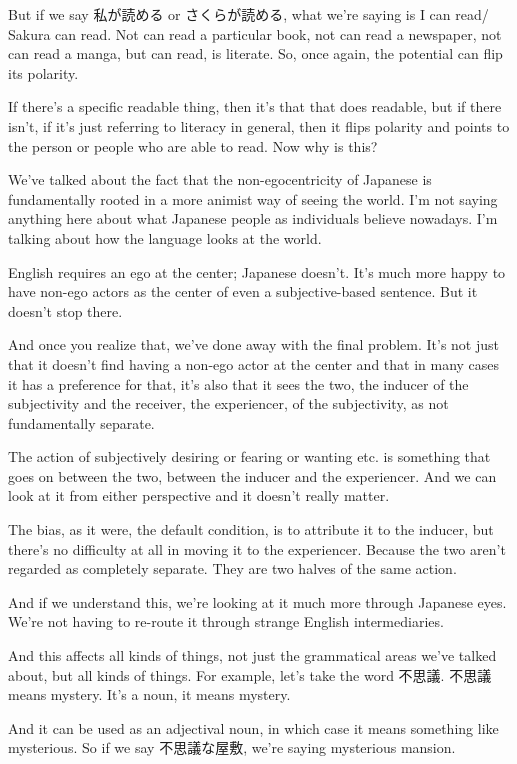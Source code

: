 But if we say 私が読める or さくらが読める, what we're saying is I can read/ Sakura can read. Not can read a particular book, not can read a newspaper, not can read a manga, but can read, is literate. So, once again, the potential can flip its polarity.

If there's a specific readable thing, then it's that that does readable, but if there isn't, if it's just referring to literacy in general, then it flips polarity and points to the person or people who are able to read. Now why is this?

We've talked about the fact that the non-egocentricity of Japanese is fundamentally rooted in a more animist way of seeing the world. I'm not saying anything here about what Japanese people as individuals believe nowadays. I'm talking about how the language looks at the world.

English requires an ego at the center; Japanese doesn't. It's much more happy to have non-ego actors as the center of even a subjective-based sentence. But it doesn't stop there.

And once you realize that, we've done away with the final problem. It's not just that it doesn't find having a non-ego actor at the center and that in many cases it has a preference for that, it's also that it sees the two, the inducer of the subjectivity and the receiver, the experiencer, of the subjectivity, as not fundamentally separate.

The action of subjectively desiring or fearing or wanting etc. is something that goes on between the two, between the inducer and the experiencer. And we can look at it from either perspective and it doesn't really matter.

The bias, as it were, the default condition, is to attribute it to the inducer, but there's no difficulty at all in moving it to the experiencer. Because the two aren't regarded as completely separate. They are two halves of the same action.

And if we understand this, we're looking at it much more through Japanese eyes. We're not having to re-route it through strange English intermediaries.

And this affects all kinds of things, not just the grammatical areas we've talked about, but all kinds of things. For example, let's take the word 不思議. 不思議 means mystery. It's a noun, it means mystery.

{}

And it can be used as an adjectival noun, in which case it means something like mysterious. So if we say 不思議な屋敷, we're saying mysterious mansion.

